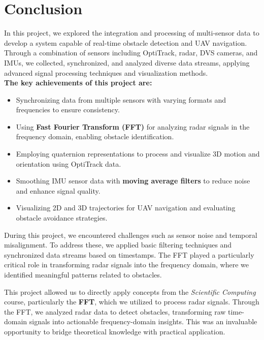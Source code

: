 \documentclass[12pt,a4paper]{article}
\begin{document}
\section{Conclusion}

 In this project, we explored the integration and processing of multi-sensor data to develop a system capable of real-time obstacle detection and UAV navigation. Through a combination of sensors including OptiTrack, radar, DVS cameras, and IMUs, we collected, synchronized, and analyzed diverse data streams, applying advanced signal processing techniques and visualization methods. \\

\textbf{The key achievements of this project are:}
\begin{itemize}
    \item Synchronizing data from multiple sensors with varying formats and frequencies to ensure consistency.
    \item Using \textbf{Fast Fourier Transform (FFT)} for analyzing radar signals in the frequency domain, enabling obstacle identification.
    \item Employing quaternion representations to process and visualize 3D motion and orientation using OptiTrack data.
    \item Smoothing IMU sensor data with \textbf{moving average filters} to reduce noise and enhance signal quality.
    \item Visualizing 2D and 3D trajectories for UAV navigation and evaluating obstacle avoidance strategies.
\end{itemize}

\setlength{\parindent}{1cm} During this project, we encountered challenges such as sensor noise and temporal misalignment. To address these, we applied basic filtering techniques and synchronized data streams based on timestamps. The FFT played a particularly critical role in transforming radar signals into the frequency domain, where we identified meaningful patterns related to obstacles.

\setlength{\parindent}{1cm} This project allowed us to directly apply concepts from the \textit{Scientific Computing} course, particularly the \textbf{FFT}, which we utilized to process radar signals. Through the FFT, we analyzed radar data to detect obstacles, transforming raw time-domain signals into actionable frequency-domain insights. This was an invaluable opportunity to bridge theoretical knowledge with practical application.
\end{document}
